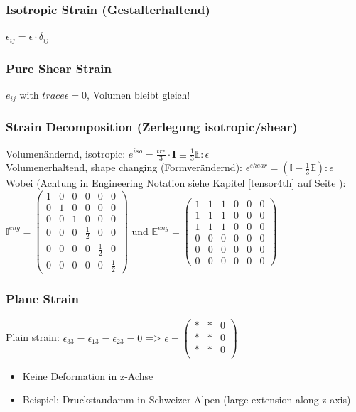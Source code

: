 \documentclass[a4paper]{scrartcl}
\begin{document}
\subsubsection{Isotropic Strain (Gestalterhaltend)}
$\epsilon_{ij} = \epsilon \cdot \delta_{ij} $

\subsubsection{Pure Shear Strain}
$e_{ij}$ with $trace \epsilon = 0$, Volumen bleibt gleich!

\subsubsection{Strain Decomposition (Zerlegung isotropic/shear)}
Volumenändernd, isotropic: $e^{iso} = \frac{tr \epsilon}{3} \cdot \mathbf{I}
\equiv \frac{1}{3} \mathbb{E} : \epsilon$\\

Volumenerhaltend, shape changing (Formverändernd): $\epsilon^{shear} =
(\mathbb{I} - \frac{1}{3} \mathbb{E} ) : \epsilon $\\
Wobei (Achtung in Engineering Notation siehe Kapitel \ref{tensor4th} auf Seite
\pageref{tensor4th}):\\ $ \mathbb{I}^{eng}=
\begin{pmatrix}
1 & 0 & 0 & 0 & 0 & 0 \\ 
0 & 1 & 0 & 0 & 0 & 0 \\ 
0 & 0 & 1 & 0 & 0 & 0 \\ 
0 & 0 & 0 & \frac{1}{2} & 0 & 0 \\ 
0 & 0 & 0 & 0 & \frac{1}{2} & 0 \\ 
0 & 0 & 0 & 0 & 0 & \frac{1}{2}
\end{pmatrix} 
$ und 
$ \mathbb{E}^{eng}=
\begin{pmatrix}
1 & 1 & 1 & 0 & 0 & 0 \\ 
1 & 1 & 1 & 0 & 0 & 0 \\ 
1 & 1 & 1 & 0 & 0 & 0 \\ 
0 & 0 & 0 & 0 & 0 & 0 \\ 
0 & 0 & 0 & 0 & 0 & 0 \\ 
0 & 0 & 0 & 0 & 0 & 0
\end{pmatrix} 
$

\subsubsection{Plane Strain}
Plain strain: $\epsilon_{33} = \epsilon_{13} = \epsilon_{23}= 0$ => $\epsilon =
\begin{pmatrix}
* & * & 0\\
* & * & 0\\
* & * & 0\\
\end{pmatrix} $\\
\begin{itemize}
  \item Keine Deformation in z-Achse
  \item Beispiel: Druckstaudamm in Schweizer Alpen (large extension along
  z-axis)
\end{itemize}
\end{document}
